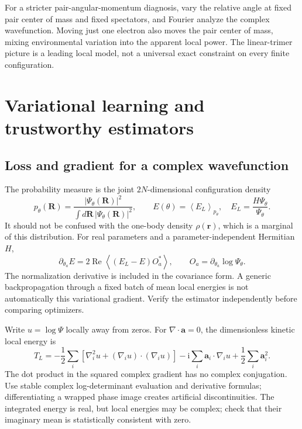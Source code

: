 \documentclass[11pt,letterpaper]{article}
\newcommand{\R}{\mathbf R}
\newcommand{\rr}{\mathbf r}
\newcommand{\ii}{\mathrm i}
\newcommand{\avg}[1]{\left\langle #1\right\rangle}
\begin{document}
For a stricter pair-angular-momentum diagnosis, vary the relative angle at fixed pair center of mass and fixed spectators, and Fourier analyze the complex wavefunction. Moving just one electron also moves the pair center of mass, mixing environmental variation into the apparent local power. The linear-trimer picture is a leading local model, not a universal exact constraint on every finite configuration.

\section{Variational learning and trustworthy estimators}
\label{sec:vmc}

\subsection{Loss and gradient for a complex wavefunction}

The probability measure is the joint $2N$-dimensional configuration density
\begin{equation}
 p_\theta(\R)=\frac{|\Psi_\theta(\R)|^2}{\int d\R\,|\Psi_\theta(\R)|^2},\qquad
 E(\theta)=\avg{E_L}_{p_\theta},\quad E_L=\frac{H\Psi_\theta}{\Psi_\theta}.
\end{equation}
It should not be confused with the one-body density $\rho(\rr)$, which is a marginal of this distribution. For real parameters and a parameter-independent Hermitian $H$,
\begin{equation}
 \partial_{\theta_a}E=2\operatorname{Re}\avg{(E_L-E)O_a^*},\qquad
 O_a=\partial_{\theta_a}\log\Psi_\theta.
 \label{eq:gradient}
\end{equation}
The normalization derivative is included in the covariance form. A generic backpropagation through a fixed batch of mean local energies is not automatically this variational gradient. Verify the estimator independently before comparing optimizers.

Write $u=\log\Psi$ locally away from zeros. For $\nabla\cdot\mathbf a=0$, the dimensionless kinetic local energy is
\begin{equation}
 T_L=-\frac12\sum_i\left[\nabla_i^2u+(\nabla_i u)\cdot(\nabla_i u)\right]
 -\ii\sum_i\mathbf a_i\cdot\nabla_i u+\frac12\sum_i\mathbf a_i^2.
 \label{eq:localT}
\end{equation}
The dot product in the squared complex gradient has no complex conjugation. Use stable complex log-determinant evaluation and derivative formulas; differentiating a wrapped phase image creates artificial discontinuities. The integrated energy is real, but local energies may be complex; check that their imaginary mean is statistically consistent with zero.
\end{document}

